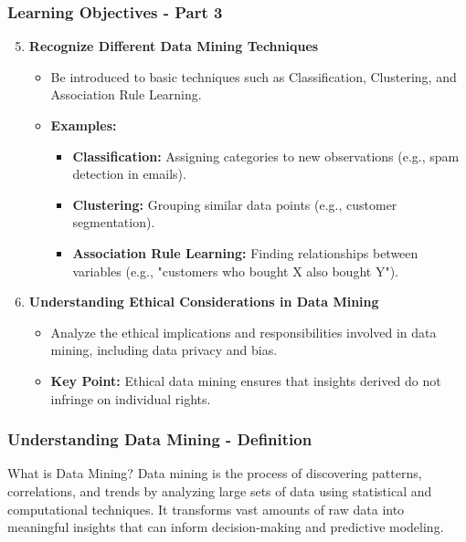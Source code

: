 \documentclass[aspectratio=169]{beamer}
\begin{document}
\begin{frame}[fragile]
    \frametitle{Learning Objectives - Part 3}
    \begin{enumerate}
        \setcounter{enumi}{4}  %
        \item \textbf{Recognize Different Data Mining Techniques}
            \begin{itemize}
                \item Be introduced to basic techniques such as Classification, Clustering, and Association Rule Learning.
                \item \textbf{Examples:}
                \begin{itemize}
                    \item \textbf{Classification:} Assigning categories to new observations (e.g., spam detection in emails).
                    \item \textbf{Clustering:} Grouping similar data points (e.g., customer segmentation).
                    \item \textbf{Association Rule Learning:} Finding relationships between variables (e.g., "customers who bought X also bought Y").
                \end{itemize}
            \end{itemize}
        
        \item \textbf{Understanding Ethical Considerations in Data Mining}
            \begin{itemize}
                \item Analyze the ethical implications and responsibilities involved in data mining, including data privacy and bias.
                \item \textbf{Key Point:} Ethical data mining ensures that insights derived do not infringe on individual rights.
            \end{itemize}
    \end{enumerate}
\end{frame}

\begin{frame}[fragile]
    \frametitle{Understanding Data Mining - Definition}
    \begin{block}{What is Data Mining?}
        Data mining is the process of discovering patterns, correlations, and trends by analyzing large sets of data using statistical and computational techniques. 
        It transforms vast amounts of raw data into meaningful insights that can inform decision-making and predictive modeling.
    \end{block}
\end{frame}
\end{document}
